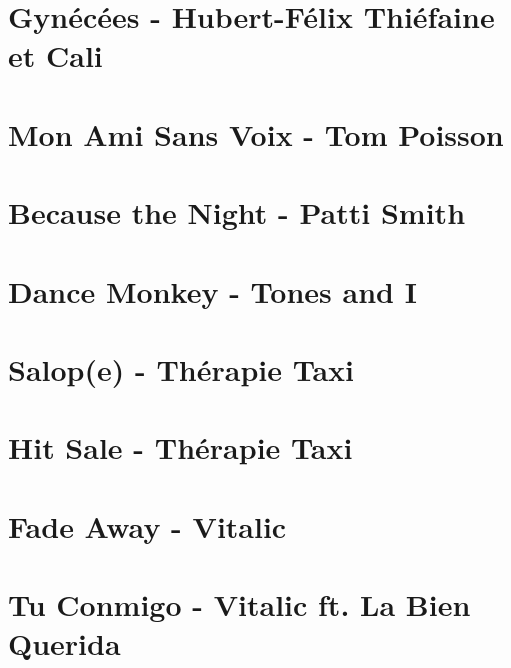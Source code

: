 \documentclass[11pt]{article}
\begin{document}
\section{Gynécées - Hubert-Félix Thiéfaine et Cali}
\begin{guitar}

\end{guitar}


\section{Mon Ami Sans Voix - Tom Poisson}
\begin{guitar}

\end{guitar}

\section{Because the Night - Patti Smith}


\section{Dance Monkey - Tones and I}
\begin{guitar}

\end{guitar}

\section{Salop(e) - Thérapie Taxi}
\begin{guitar}

\end{guitar}

\section{Hit Sale - Thérapie Taxi}
\begin{guitar}

\end{guitar}

\section{Fade Away - Vitalic}


\section{Tu Conmigo - Vitalic ft. La Bien Querida}

\end{document}

